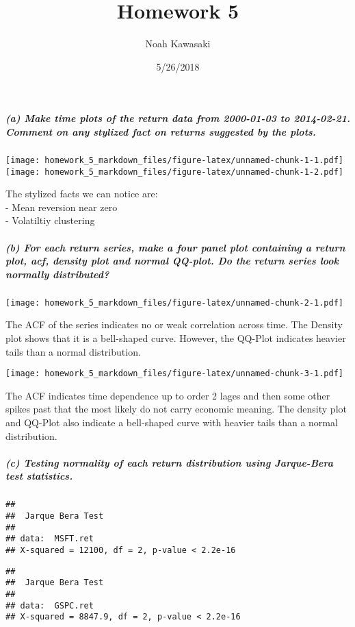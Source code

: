 \documentclass[]{article}
\title{Homework 5}
\author{Noah Kawasaki}
\date{5/26/2018}
\let\oldsubparagraph\subparagraph
\renewcommand{\subparagraph}[1]{\oldsubparagraph{#1}\mbox{}}
\begin{document}
\maketitle

\subparagraph{(a) Make time plots of the return data from 2000-01-03 to
2014-02-21. Comment on any stylized fact on returns suggested by the
plots.}\label{a-make-time-plots-of-the-return-data-from-2000-01-03-to-2014-02-21.-comment-on-any-stylized-fact-on-returns-suggested-by-the-plots.}

\texttt{[image: homework\_5\_markdown\_files/figure-latex/unnamed-chunk-1-1.pdf]}
\texttt{[image: homework\_5\_markdown\_files/figure-latex/unnamed-chunk-1-2.pdf]}

The stylized facts we can notice are:\\
- Mean reversion near zero\\
- Volatiltiy clustering

\subparagraph{(b) For each return series, make a four panel plot
containing a return plot, acf, density plot and normal QQ-plot. Do the
return series look normally
distributed?}\label{b-for-each-return-series-make-a-four-panel-plot-containing-a-return-plot-acf-density-plot-and-normal-qq-plot.-do-the-return-series-look-normally-distributed}

\texttt{[image: homework\_5\_markdown\_files/figure-latex/unnamed-chunk-2-1.pdf]}

The ACF of the series indicates no or weak correlation across time. The
Density plot shows that it is a bell-shaped curve. However, the QQ-Plot
indicates heavier tails than a normal distribution.

\texttt{[image: homework\_5\_markdown\_files/figure-latex/unnamed-chunk-3-1.pdf]}

The ACF indicates time dependence up to order 2 lages and then some
other spikes past that the most likely do not carry economic meaning.
The density plot and QQ-Plot also indicate a bell-shaped curve with
heavier tails than a normal distribution.

\subparagraph{(c) Testing normality of each return distribution using
Jarque-Bera test
statistics.}\label{c-testing-normality-of-each-return-distribution-using-jarque-bera-test-statistics.}

\begin{verbatim}
## 
##  Jarque Bera Test
## 
## data:  MSFT.ret
## X-squared = 12100, df = 2, p-value < 2.2e-16
\end{verbatim}

\begin{verbatim}
## 
##  Jarque Bera Test
## 
## data:  GSPC.ret
## X-squared = 8847.9, df = 2, p-value < 2.2e-16
\end{verbatim}
\end{document}
